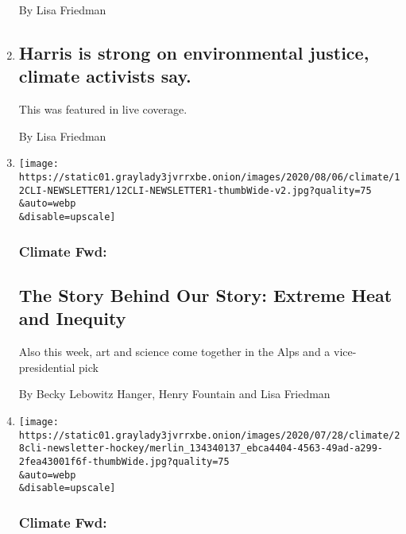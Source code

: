 \begin{enumerate}
  By Lisa Friedman
\item
  \href{/live/2020/08/12/us/biden-vs-trump/harris-is-strong-on-environmental-justice-climate-activists-say}{}

  \hypertarget{harris-is-strong-on-environmental-justice-climate-activists-say}{%
  \subsection{Harris is strong on environmental justice, climate
  activists
  say.}\label{harris-is-strong-on-environmental-justice-climate-activists-say}}

  This was featured in live coverage.

  By Lisa Friedman
\item
  \href{/2020/08/12/climate/extreme-heat-inequality.html}{}

  \texttt{[image: https://static01.graylady3jvrrxbe.onion/images/2020/08/06/climate/12CLI-NEWSLETTER1/12CLI-NEWSLETTER1-thumbWide-v2.jpg?quality=75\\\&auto=webp\\\&disable=upscale]}

  \hypertarget{climate-fwd}{%
  \subsubsection{Climate Fwd:}\label{climate-fwd}}

  \hypertarget{the-story-behind-our-story-extreme-heat-and-inequity}{%
  \subsection{The Story Behind Our Story: Extreme Heat and
  Inequity}\label{the-story-behind-our-story-extreme-heat-and-inequity}}

  Also this week, art and science come together in the Alps and a
  vice-presidential pick

  By Becky Lebowitz Hanger, Henry Fountain and Lisa Friedman
\item
  \href{/2020/07/29/climate/skating-hockey-climate-change.html}{}

  \texttt{[image: https://static01.graylady3jvrrxbe.onion/images/2020/07/28/climate/28cli-newsletter-hockey/merlin\_134340137\_ebca4404-4563-49ad-a299-2fea43001f6f-thumbWide.jpg?quality=75\\\&auto=webp\\\&disable=upscale]}

  \hypertarget{climate-fwd-1}{%
  \subsubsection{Climate Fwd:}\label{climate-fwd-1}}


\end{enumerate}
